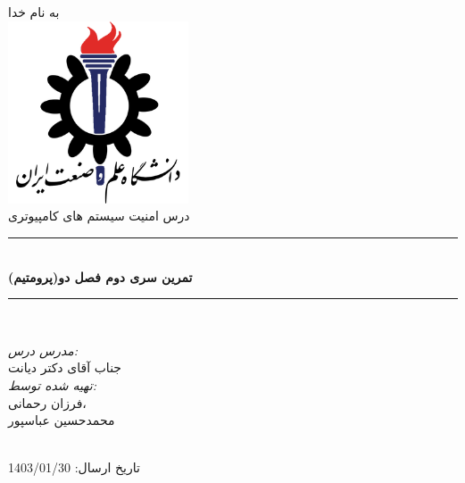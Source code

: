 \documentclass[11pt]{article}
\begin{document}
\begin{titlepage}

\newcommand{\HRule}{\rule{\linewidth}{0.5mm}}

\center 

\textsc{\LARGE به نام خدا}\\[1cm] 

\includegraphics[width=0.4\textwidth]{Images/IUSTLogo.png}\\[1cm] 

\textsc{\Large درس امنیت سیستم های کامپیوتری  }

\HRule \\[0.4cm]
{ \huge \bfseries تمرین سری دوم فصل دو(پرومتیم) }\\ 
\HRule \\[1.5cm]

\begin{minipage}{0.4\textwidth}
\begin{center} \large
\emph{مدرس درس: } \\
جناب آقای دکتر دیانت \\[1cm]
\emph{تهیه شده توسط: }\\
فرزان رحمانی، \\
محمدحسین عباسپور
\end{center}
\end{minipage}\\[1cm]
{\large تاریخ ارسال: 1403/01/30}\\[2cm]
\vfill 

\end{titlepage}


\end{document}
